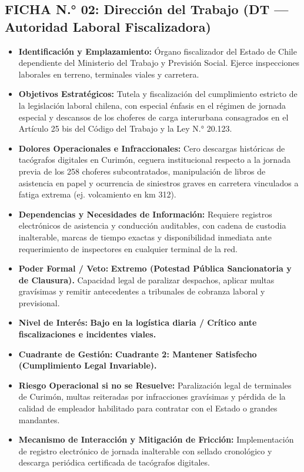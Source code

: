 \subsection*{FICHA N.° 02: Dirección del Trabajo (DT — Autoridad Laboral Fiscalizadora)}
\begin{itemize}
\item \textbf{Identificación y Emplazamiento:} Órgano fiscalizador del Estado de Chile dependiente del Ministerio del Trabajo y Previsión Social. Ejerce inspecciones laborales en terreno, terminales viales y carretera.
\item \textbf{Objetivos Estratégicos:} Tutela y fiscalización del cumplimiento estricto de la legislación laboral chilena, con especial énfasis en el régimen de jornada especial y descansos de los choferes de carga interurbana consagrados en el Artículo 25 bis del Código del Trabajo y la Ley N.° 20.123.
\item \textbf{Dolores Operacionales e Infraccionales:} Cero descargas históricas de tacógrafos digitales en Curimón, ceguera institucional respecto a la jornada previa de los 258 choferes subcontratados, manipulación de libros de asistencia en papel y ocurrencia de siniestros graves en carretera vinculados a fatiga extrema (ej. volcamiento en km 312).
\item \textbf{Dependencias y Necesidades de Información:} Requiere registros electrónicos de asistencia y conducción auditables, con cadena de custodia inalterable, marcas de tiempo exactas y disponibilidad inmediata ante requerimiento de inspectores en cualquier terminal de la red.
\item \textbf{Poder Formal / Veto:} \textbf{Extremo (Potestad Pública Sancionatoria y de Clausura).} Capacidad legal de paralizar despachos, aplicar multas gravísimas y remitir antecedentes a tribunales de cobranza laboral y previsional.
\item \textbf{Nivel de Interés:} \textbf{Bajo en la logística diaria / Crítico ante fiscalizaciones e incidentes viales.}
\item \textbf{Cuadrante de Gestión:} \textbf{Cuadrante 2: Mantener Satisfecho (Cumplimiento Legal Invariable).}
\item \textbf{Riesgo Operacional si no se Resuelve:} Paralización legal de terminales de Curimón, multas reiteradas por infracciones gravísimas y pérdida de la calidad de empleador habilitado para contratar con el Estado o grandes mandantes.
\item \textbf{Mecanismo de Interacción y Mitigación de Fricción:} Implementación de registro electrónico de jornada inalterable con sellado cronológico y descarga periódica certificada de tacógrafos digitales.
\end{itemize}
